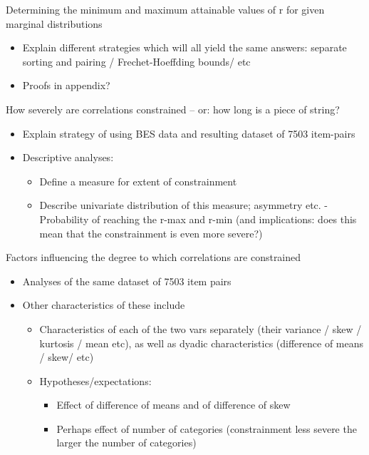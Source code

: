 \documentclass[
  12pt,
]{article}
\providecommand{\tightlist}{%
  \setlength{\itemsep}{0pt}\setlength{\parskip}{0pt}}\usepackage{longtable,booktabs,array}
\begin{document}
Determining the minimum and maximum attainable values of r for given
marginal distributions

\begin{itemize}
\tightlist
\item
  Explain different strategies which will all yield the same answers:
  separate sorting and pairing / Frechet-Hoeffding bounds/ etc
\item
  Proofs in appendix?
\end{itemize}

How severely are correlations constrained -- or: how long is a piece of
string?

\begin{itemize}
\tightlist
\item
  Explain strategy of using BES data and resulting dataset of 7503
  item-pairs
\item
  Descriptive analyses:

  \begin{itemize}
  \tightlist
  \item
    Define a measure for extent of constrainment
  \item
    Describe univariate distribution of this measure; asymmetry etc.
    -Probability of reaching the r-max and r-min (and implications: does
    this mean that the constrainment is even more severe?)
  \end{itemize}
\end{itemize}

Factors influencing the degree to which correlations are constrained

\begin{itemize}
\tightlist
\item
  Analyses of the same dataset of 7503 item pairs
\item
  Other characteristics of these include

  \begin{itemize}
  \tightlist
  \item
    Characteristics of each of the two vars separately (their variance /
    skew / kurtosis / mean etc), as well as dyadic characteristics
    (difference of means / skew/ etc)
  \item
    Hypotheses/expectations:

    \begin{itemize}
    \tightlist
    \item
      Effect of difference of means and of difference of skew
    \item
      Perhaps effect of number of categories (constrainment less severe
      the larger the number of categories)
    \end{itemize}
  \end{itemize}
\end{itemize}
\end{document}
